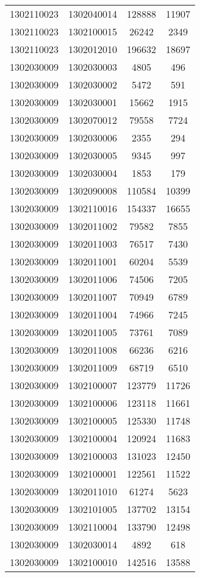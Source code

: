 \begin{longtable}{llcc}
1302110023 & 1302040014 & 128888 & 11907\\
1302110023 & 1302100015 & 26242 & 2349\\
1302110023 & 1302012010 & 196632 & 18697\\
1302030009 & 1302030003 & 4805 & 496\\
1302030009 & 1302030002 & 5472 & 591\\
1302030009 & 1302030001 & 15662 & 1915\\
1302030009 & 1302070012 & 79558 & 7724\\
1302030009 & 1302030006 & 2355 & 294\\
1302030009 & 1302030005 & 9345 & 997\\
1302030009 & 1302030004 & 1853 & 179\\
1302030009 & 1302090008 & 110584 & 10399\\
1302030009 & 1302110016 & 154337 & 16655\\
1302030009 & 1302011002 & 79582 & 7855\\
1302030009 & 1302011003 & 76517 & 7430\\
1302030009 & 1302011001 & 60204 & 5539\\
1302030009 & 1302011006 & 74506 & 7205\\
1302030009 & 1302011007 & 70949 & 6789\\
1302030009 & 1302011004 & 74966 & 7245\\
1302030009 & 1302011005 & 73761 & 7089\\
1302030009 & 1302011008 & 66236 & 6216\\
1302030009 & 1302011009 & 68719 & 6510\\
1302030009 & 1302100007 & 123779 & 11726\\
1302030009 & 1302100006 & 123118 & 11661\\
1302030009 & 1302100005 & 125330 & 11748\\
1302030009 & 1302100004 & 120924 & 11683\\
1302030009 & 1302100003 & 131023 & 12450\\
1302030009 & 1302100001 & 122561 & 11522\\
1302030009 & 1302011010 & 61274 & 5623\\
1302030009 & 1302101005 & 137702 & 13154\\
1302030009 & 1302110004 & 133790 & 12498\\
1302030009 & 1302030014 & 4892 & 618\\
1302030009 & 1302100010 & 142516 & 13588\\

\end{longtable}

